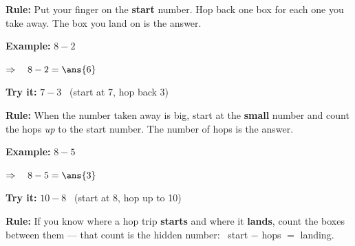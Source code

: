 \documentclass[12pt]{article}
\begin{document}


\begin{formulabox}
\textbf{Rule:} Put your finger on the \textbf{start} number. Hop back one
box for each one you take away. The box you land on is the answer.
\end{formulabox}

\begin{examplebox}
\textbf{Example:} \quad $8 - 2$

$\Rightarrow\quad 8 - 2 = \ans{6}$
\end{examplebox}

\begin{tryitbox}
\textbf{Try it:} \quad $7 - 3$ \ (start at 7, hop back 3)\\[2pt]
\end{tryitbox}


\begin{formulabox}
\textbf{Rule:} When the number taken away is big, start at the \textbf{small}
number and count the hops \emph{up} to the start number. The number of hops
is the answer.
\end{formulabox}

\begin{examplebox}
\textbf{Example:} \quad $8 - 5$

$\Rightarrow\quad 8 - 5 = \ans{3}$
\end{examplebox}

\begin{tryitbox}
\textbf{Try it:} \quad $10 - 8$ \ (start at 8, hop up to 10)\\[2pt]
\end{tryitbox}


\begin{formulabox}
\textbf{Rule:} If you know where a hop trip \textbf{starts} and where it
\textbf{lands}, count the boxes between them --- that count is the hidden
number: \ start $-$ hops $=$ landing.
\end{formulabox}
\end{document}
